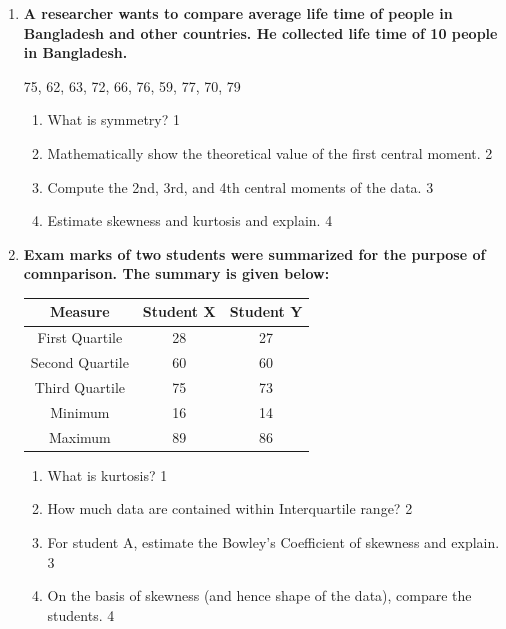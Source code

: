 \documentclass[a4paper,oneside]{book}
\begin{document}
\begin{enumerate}
  
   \item
	  \textbf{A researcher wants to compare average life time of people in Bangladesh and other countries. He collected life time of 10 people in Bangladesh.} 
	  
	  	\begin{center}
	  75, 62, 63, 72, 66, 76, 59, 77, 70, 79
	  	\end{center}
  
  \begin{enumerate}
    \item
	What is symmetry? \hfill 1
    \item
	Mathematically show the theoretical value of the first central moment. \hfill 2
    \item  
	Compute the 2nd, 3rd, and 4th central moments of the data. \hfill 3
    \item
	Estimate skewness and kurtosis and explain. \hfill 4
  \end{enumerate}
  
   \item
	  \textbf{Exam marks of two students were summarized for the purpose of comnparison. The summary is given below:} 
	  
	  \begin{table}[h]
	  \centering
\begin{tabular}{c|c|c}
Measure         & Student X & Student Y \\ \hline
First Quartile  & 28        & 27        \\
Second Quartile & 60        & 60        \\
Third Quartile  & 75        & 73        \\
Minimum         & 16        & 14        \\ 
Maximum         & 89        & 86        \\  \hline
\end{tabular}
\end{table}
  
  \begin{enumerate}
    \item
	What is kurtosis? \hfill 1
    \item
	How much data are contained within Interquartile range? \hfill 2
    \item  
	For student A, estimate the Bowley's Coefficient of skewness and explain. \hfill 3
    \item
	On the basis of skewness (and hence shape of the data), compare the students. \hfill 4
  \end{enumerate}
  

\end{enumerate}
\end{document}
